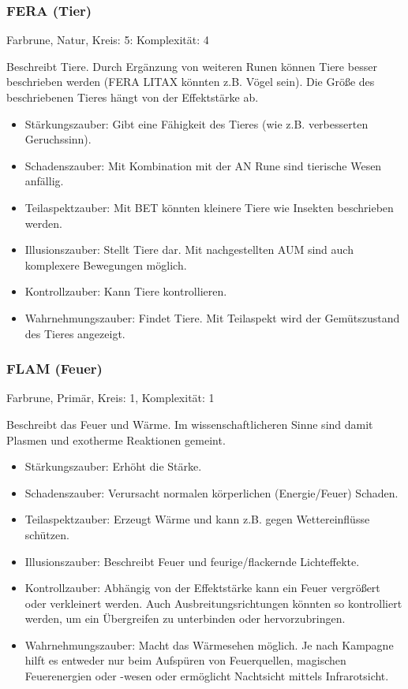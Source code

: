 \documentclass{article}
\begin{document}
\subsubsection{FERA (Tier)}

Farbrune, Natur, Kreis: 5: Komplexität: 4

Beschreibt Tiere. Durch Ergänzung von weiteren Runen können Tiere besser beschrieben werden (FERA LITAX könnten z.B.
Vögel sein). Die Größe des beschriebenen Tieres hängt von der Effektstärke ab.

\begin{itemize}
\item Stärkungszauber: Gibt eine Fähigkeit des Tieres (wie z.B. verbesserten Geruchssinn).
\item Schadenszauber: Mit Kombination mit der AN Rune sind tierische Wesen anfällig.
\item Teilaspektzauber: Mit BET könnten kleinere Tiere wie Insekten beschrieben werden.
\item Illusionszauber: Stellt Tiere dar. Mit nachgestellten AUM sind auch komplexere Bewegungen möglich.
\item Kontrollzauber: Kann Tiere kontrollieren.
\item Wahrnehmungszauber: Findet Tiere. Mit Teilaspekt wird der Gemütszustand des Tieres angezeigt.
\end{itemize}

\subsubsection{FLAM (Feuer)}

Farbrune, Primär, Kreis: 1, Komplexität: 1

Beschreibt das Feuer und Wärme. Im wissenschaftlicheren Sinne sind damit Plasmen und exotherme Reaktionen gemeint.

\begin{itemize}
\item Stärkungszauber: Erhöht die Stärke.
\item Schadenszauber: Verursacht normalen körperlichen (Energie/Feuer) Schaden.
\item Teilaspektzauber: Erzeugt Wärme und kann z.B. gegen Wettereinflüsse schützen.
\item Illusionszauber: Beschreibt Feuer und feurige/flackernde Lichteffekte.
\item Kontrollzauber: Abhängig von der Effektstärke kann ein Feuer vergrößert oder verkleinert werden. Auch Ausbreitungsrichtungen könnten so kontrolliert werden, um ein Übergreifen zu unterbinden oder hervorzubringen. 
\item Wahrnehmungszauber: Macht das Wärmesehen möglich. Je nach Kampagne hilft es entweder nur beim Aufspüren von Feuerquellen, magischen Feuerenergien oder -wesen oder ermöglicht Nachtsicht mittels Infrarotsicht.
\end{itemize}
\end{document}
